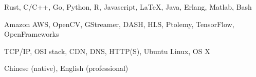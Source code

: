 \begin{cvskills}

   {Rust, C/C++, Go, Python, R, Javascript, \LaTeX, Java, Erlang,
    Matlab, Bash}

   {Amazon AWS, OpenCV, GStreamer, DASH, HLS, Ptolemy, TensorFlow, OpenFrameworks}

   {TCP/IP, OSI stack, CDN, DNS, HTTP(S), Ubuntu Linux, OS X}

   {Chinese (native), English (professional)}

\end{cvskills}

